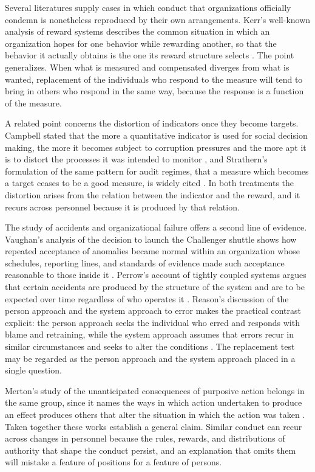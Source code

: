 \documentclass[11pt]{article}
\theoremstyle{definition}
\begin{document}
Several literatures supply cases in which conduct that organizations officially condemn is nonetheless reproduced by their own arrangements. Kerr's well-known analysis of reward systems describes the common situation in which an organization hopes for one behavior while rewarding another, so that the behavior it actually obtains is the one its reward structure selects \cite{kerr1975}. The point generalizes. When what is measured and compensated diverges from what is wanted, replacement of the individuals who respond to the measure will tend to bring in others who respond in the same way, because the response is a function of the measure.

A related point concerns the distortion of indicators once they become targets. Campbell stated that the more a quantitative indicator is used for social decision making, the more it becomes subject to corruption pressures and the more apt it is to distort the processes it was intended to monitor \cite{campbell1979}, and Strathern's formulation of the same pattern for audit regimes, that a measure which becomes a target ceases to be a good measure, is widely cited \cite{strathern1997}. In both treatments the distortion arises from the relation between the indicator and the reward, and it recurs across personnel because it is produced by that relation.

The study of accidents and organizational failure offers a second line of evidence. Vaughan's analysis of the decision to launch the Challenger shuttle shows how repeated acceptance of anomalies became normal within an organization whose schedules, reporting lines, and standards of evidence made such acceptance reasonable to those inside it \cite{vaughan1996}. Perrow's account of tightly coupled systems argues that certain accidents are produced by the structure of the system and are to be expected over time regardless of who operates it \cite{perrow1984}. Reason's discussion of the person approach and the system approach to error makes the practical contrast explicit: the person approach seeks the individual who erred and responds with blame and retraining, while the system approach assumes that errors recur in similar circumstances and seeks to alter the conditions \cite{reason2000}. The replacement test may be regarded as the person approach and the system approach placed in a single question.

Merton's study of the unanticipated consequences of purposive action belongs in the same group, since it names the ways in which action undertaken to produce an effect produces others that alter the situation in which the action was taken \cite{merton1936}. Taken together these works establish a general claim. Similar conduct can recur across changes in personnel because the rules, rewards, and distributions of authority that shape the conduct persist, and an explanation that omits them will mistake a feature of positions for a feature of persons.
\end{document}

